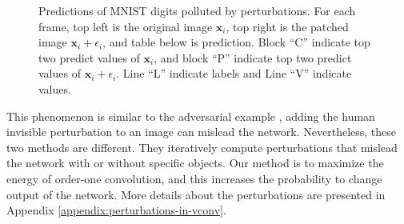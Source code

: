 \documentclass[twoside,11pt]{article}
\def\tvar#1{\mathbf{#1}} %
\begin{document}
\begin{figure}[htb!]
  \caption{Predictions of MNIST digits polluted by perturbations. For each frame, top left is the original image \(\tvar{x}_i\), top right is the patched image \(\tvar{x}_i + \epsilon_i\), and table below is prediction. Block ``C'' indicate top two predict values of \(\tvar{x}_i\), and block ``P'' indicate top two predict values of \(\tvar{x}_i + \epsilon_i\). Line ``L'' indicate labels and Line ``V'' indicate values.}
  \label{fig:mnist-digits-perturbed-by-specialized-perturbations}
\end{figure}

This phenomenon is similar to the adversarial example \citep{Szegedy2013,Goodfellow2014}, adding the human invisible perturbation to an image can mislead the network. Nevertheless, these two methods are different. They iteratively compute perturbations that mislead the network with or without specific objects. Our method is to maximize the energy of order-one convolution, and this increases the probability to change output of the network.
More details about the perturbations are presented in Appendix \ref{appendix:perturbations-in-vconv}.
\end{document}
